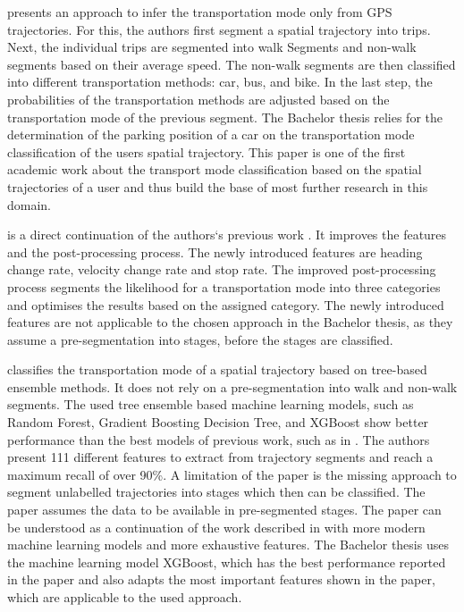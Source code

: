 \cite{Zheng2008} presents an approach to infer the transportation mode only from GPS trajectories. For this, the authors first segment a spatial trajectory into trips. Next, the individual trips are segmented into walk Segments and non-walk segments based on their average speed. The non-walk segments are then classified into different transportation methods: car, bus, and bike. In the last step, the probabilities of the transportation methods are adjusted based on the transportation mode of the previous segment. \newline
The Bachelor thesis relies for the determination of the parking position of a car on the transportation mode classification of the users spatial trajectory. This paper is one of the first academic work about the transport mode classification based on the spatial trajectories of a user and thus build the base of most further research in this domain.

\cite{zheng2008understanding} is a direct continuation of the authors`s previous work \cite{Zheng2008}. It improves the features and the post-processing process. The newly introduced features are heading change rate, velocity change rate and stop rate. The improved post-processing process segments the likelihood for a transportation mode into three categories and optimises the results based on the assigned category. \newline
The newly introduced features are not applicable to the chosen approach in the Bachelor thesis, as they assume a pre-segmentation into stages, before the stages are classified.

\cite{Xiao2017} classifies the transportation mode of a spatial trajectory based on tree-based ensemble methods. It does not rely on a pre-segmentation into walk and non-walk segments. The used tree ensemble based machine learning models, such as Random Forest, Gradient Boosting Decision Tree, and XGBoost show better performance than the best models of previous work, such as in \cite{Zheng2008}. The authors present 111 different features to extract from trajectory segments and reach a maximum recall of over 90\%. A limitation of the paper is the missing approach to segment unlabelled trajectories into stages which then can be classified. The paper assumes the data to be available in pre-segmented stages.\newline
The paper can be understood as a continuation of the work described in \cite{Zheng2008} with more modern machine learning models and more exhaustive features. The Bachelor thesis uses the machine learning model XGBoost, which has the best performance reported in the paper and also adapts the most important features shown in the paper, which are applicable to the used approach. \cite{chen2016xgboost}

